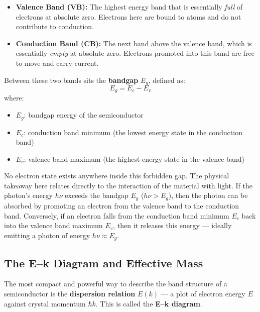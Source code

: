 \begin{itemize}
    \item \textbf{Valence Band (VB):} The highest energy band that is essentially \emph{full} of electrons at absolute zero. Electrons here are bound to atoms and do not contribute to conduction.
    \item \textbf{Conduction Band (CB):} The next band above the valence band, which is essentially \emph{empty} at absolute zero. Electrons promoted into this band are free to move and carry current.
\end{itemize}

Between these two bands sits the \textbf{bandgap} $E_g$, defined as:
\begin{equation*}
    E_g = E_c - E_v
\end{equation*}
where:
\begin{itemize}
    \item $E_g$: bandgap energy of the semiconductor
    \item $E_c$: conduction band minimum (the lowest energy state in the conduction band)
    \item $E_v$: valence band maximum (the highest energy state in the valence band)
\end{itemize}

No electron state exists anywhere inside this forbidden gap. The physical takeaway here relates directly to the interaction of the material with light. If the photon's energy $h\nu$ exceeds the bandgap $E_g$ ($h\nu > E_g$), then the photon can be absorbed by promoting an electron from the valence band to the conduction band. Conversely, if an electron falls from the conduction band minimum $E_c$ back into the valence band maximum $E_v$, then it releases this energy — ideally emitting a photon of energy $h\nu \approx E_g$.

\subsection{The E–k Diagram and Effective Mass}

The most compact and powerful way to describe the band structure of a semiconductor is the \textbf{dispersion relation} $E(k)$ — a plot of electron energy $E$ against crystal momentum $\hbar k$. This is called the \textbf{E–k diagram}.

